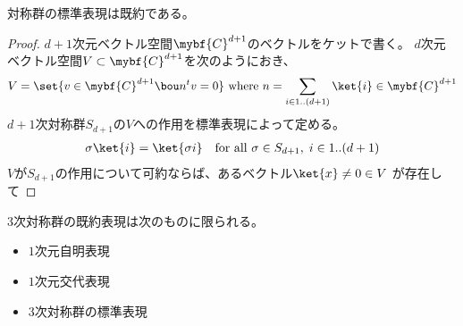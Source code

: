 	\begin{proposition}[標準表現の既約性]\label{prop:標準表現の既約性} %
		対称群の標準表現は既約である。
	\end{proposition} %
	\begin{proof} %
		$d+1$次元ベクトル空間$\mybf{C}^{d+1}$のベクトルをケットで書く。
		$d$次元ベクトル空間$V\subset \mybf{C}^{d+1}$を次のようにおき、
		\begin{equation*}\begin{split} %
			V = \set{v\in \mybf{C}^{d+1}\bou n^tv=0} \text{ where }
			n = \sum_{i\in1..(d+1)}\ket{i}\in \mybf{C}^{d+1}
		\end{split}\end{equation*} %
		$d+1$次対称群$S_{d+1}$の$V$への作用を標準表現によって定める。
		\begin{equation*}\begin{split} %
			\sigma\ket{i} = \ket{\sigma i} \quad\text{for all }\sigma\in S_{d+1}
			,\;i\in1..(d+1)
		\end{split}\end{equation*} %
		$V$が$S_{d+1}$の作用について可約ならば、あるベクトル$\ket{x}\neq0\in V$
		が存在して
	\end{proof} %

	\begin{proposition}[対称群の既約表現]\label{prop:対称群の既約性} %
		$3$次対称群の既約表現は次のものに限られる。
		\begin{itemize}\setlength{\itemsep}{-1mm} %
			\item $1$次元自明表現
			\item $1$次元交代表現
			\item $3$次対称群の標準表現
		\end{itemize} %
	\end{proposition} %
\endgroup %
